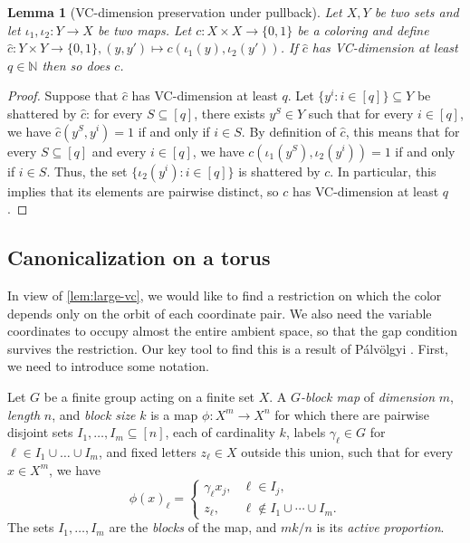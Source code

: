 \documentclass[10pt,a4paper]{amsart}
\newtheorem{lemma}[theorem]{Lemma}
\begin{document}
\begin{lemma}[VC-dimension preservation under pullback]\label{lem:transfer-VC-dim}
    Let $X, Y$ be two sets and let $\iota_1, \iota_2 : Y \to X$ be two maps.
    Let $c : X \times X \to \{0, 1\}$ be a coloring and define $\widehat{c} : Y \times Y \to \{0, 1\}, (y, y') \mapsto c(\iota_1(y), \iota_2(y'))$.
    If $\widehat{c}$ has VC-dimension at least $q \in \mathbb{N}$ then so does $c$.
\end{lemma}

\begin{proof}
    Suppose that $\widehat{c}$ has VC-dimension at least $q$.
    Let $\{y^i : i \in [q]\} \subseteq Y$ be shattered by $\widehat{c}$: for every $S \subseteq [q]$, there exists $y^S \in Y$ such that for every $i \in [q]$, we have $\widehat{c}(y^S, y^i) = 1$ if and only if $i \in S$.
    By definition of $\widehat{c}$, this means that for every $S \subseteq [q]$ and every $i \in [q]$, we have $c(\iota_1(y^S), \iota_2(y^i)) = 1$ if and only if $i \in S$.
    Thus, the set $\{\iota_2(y^i) : i \in [q]\}$ is shattered by $c$.
    In particular, this implies that its elements are pairwise distinct, so $c$ has VC-dimension at least $q$.
\end{proof}

\subsection{Canonicalization on a torus}

In view of \cref{lem:large-vc}, we would like to find a restriction on which the color depends only on the orbit of each coordinate pair. 
We also need the variable coordinates to occupy almost the entire ambient space, so that the gap condition survives the restriction.
Our key tool to find this is a result of Pálvölgyi \cite{Palvolgyi26}. First, we need to introduce some notation.

Let $G$ be a finite group acting on a finite set $X$.
A \emph{$G$-block map} of \emph{dimension} $m$, \emph{length} $n$, and \emph{block size} $k$ is a map $\phi : X^m \to X^n$ for which there are pairwise disjoint sets $I_1, \ldots, I_m \subseteq [n]$, each of cardinality $k$, labels $\gamma_{\ell} \in G$ for $\ell \in I_1 \cup \ldots \cup I_m$, and fixed letters $z_\ell \in X$ outside this union, such that for every $x \in X^m$, we have \[
  \phi(x)_\ell=
  \begin{cases}
    \gamma_\ell x_j,&\ell\in I_j,\\
    z_\ell,&\ell\notin I_1\cup\cdots\cup I_m.
  \end{cases}
\]
The sets $I_1,\ldots,I_m$ are the \emph{blocks} of the map, and $mk/n$ is its \emph{active proportion}.
\end{document}
